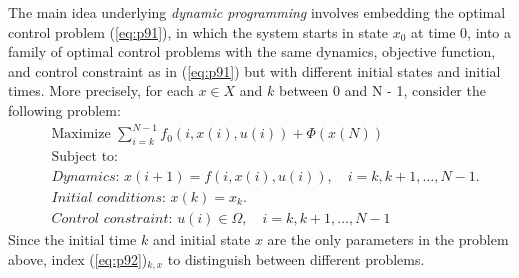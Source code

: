 The main idea underlying \textit{dynamic programming} involves embedding the optimal control problem (\ref{eq:p91}), in which the system starts in state $x_0$ at time $0$, into a family of optimal control problems with the same dynamics, objective function, and control constraint as in (\ref{eq:p91}) but with different initial states and initial times. More precisely, for each $x \in X$ and $k$ between 0 and N - 1, consider the following
problem:
\begin{equation}\label{eq:p92}
    \begin{split}
        &\text{Maximize } \sum_{i=k}^{N-1} f_0(i,x(i),u(i)) + \Phi(x(N))\\
        &\text{Subject to: }\\
        &\textit{Dynamics: } x(i+1) =  f (i,x(i),u(i)), \quad i = k,k+1,\dots, N-1.\\
        &\textit{Initial conditions: } x(k)=x_k.\\
        &\textit{Control constraint: } u(i) \in \Omega,\quad i = k,k+1,\dots,N-1
    \end{split}
\end{equation}
\noindent Since the initial time $k$ and initial state $x$ are the only parameters in the problem above, index (\ref{eq:p92})$_{k,x}$ to distinguish between different problems.

